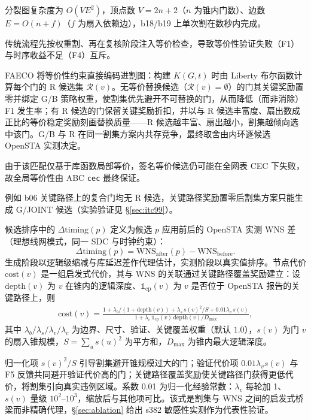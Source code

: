 \documentclass[journal]{IEEEtran}
\begin{document}
分裂图复杂度为 $O(VE^2)$，顶点数 $V=2n+2$（$n$ 为锥内门数）、边数 $E=O(n+f)$（$f$ 为扇入依赖边），b18/b19 上单次割在数秒内完成。

传统流程先按权重割、再在复核阶段注入等价检查，导致等价性验证失败（F1）与时序收益不足（F4）互斥。

FAECO 将等价性约束直接编码进割图：构建 $K(G, t)$ 时由 Liberty 布尔函数计算每个门的 R 候选集 $\mathcal{R}(v)$。无等价替换候选（$\mathcal{R}(v)=\emptyset$）的门其关键奖励置零并绑定 G/B 策略权重，使割集优先避开不可替换的门，从而降低（而非消除）F1 发生率；有 R 候选的门保留关键奖励折扣，并以与 R 候选丰富度、扇出数成正比的等价稳定奖励刻画替换质量——R 候选越丰富、扇出越小，割集越倾向选中该门。G/B 与 R 在同一割集方案内共存竞争，最终取舍由内环逐候选 OpenSTA 实测决定。

由于该匹配仅基于库函数局部等价，签名等价候选仍可能在全网表 CEC 下失败，故全局等价性由 ABC \texttt{cec} 最终保证。

例如 b06 关键路径上的复合门均无 R 候选，关键路径奖励置零后割集方案只能生成 G/JOINT 候选（实验验证见 \S\ref{sec:itc99}）。

候选排序中的 $\Delta\mathrm{timing}(p)$ 定义为候选 $p$ 应用前后的 OpenSTA 实测 WNS 差（理想线网模式，同一 SDC 与时钟约束）：
\begin{equation}\label{eq:dtiming}
\Delta\mathrm{timing}(p) = \mathrm{WNS}_{\mathrm{after}}(p) - \mathrm{WNS}_{\mathrm{before}}.
\end{equation}
生成阶段以逻辑级缩减与库延迟差作代理估计，实测阶段以真实值排序。节点代价 $\mathrm{cost}(v)$ 是一组启发式代价，其与 WNS 的关联通过关键路径覆盖奖励建立：设 $\mathrm{depth}(v)$ 为 $v$ 在锥内的逻辑深度、$\mathbb{1}_{\mathrm{cp}}(v)$ 为 $v$ 是否位于 OpenSTA 报告的关键路径上，则
{\small
\begin{equation}
\label{eq:cost}
\begin{split}
\mathrm{cost}(v) = \frac{1 + \lambda_b/(1+\mathrm{depth}(v)) + \lambda_s\,s(v)^2/S + 0.01\lambda_v\,s(v)}{1 + \lambda_c\,\mathbb{1}_{\mathrm{cp}}(v)\,\mathrm{depth}(v)/D_{\max}},
\end{split}
\end{equation}
}
其中 $\lambda_b/\lambda_s/\lambda_v/\lambda_c$ 为边界、尺寸、验证、关键覆盖权重（默认 $1.0$），$s(v)$ 为门 $v$ 的扇入锥规模，$S=\sum_u s(u)^2$ 为平方和，$D_{\max}$ 为锥内最大逻辑深度。

归一化项 $s(v)^2/S$ 引导割集避开锥规模过大的门；验证代价项 $0.01\lambda_v s(v)$ 与 F5 反馈共同避开验证代价高的门；关键路径覆盖奖励使关键路径门获得更低代价，将割集引向真实违例区域。系数 0.01 为归一化经验常数：$\lambda_v$ 每轮加 1、$s(v)$ 量级 $10^2$--$10^3$，缩放后与其他项可比。该式是割集与 WNS 之间的启发式桥梁而非精确代理，\S\ref{sec:ablation} 给出 s382 敏感性实测作为代表性验证。
\end{document}
